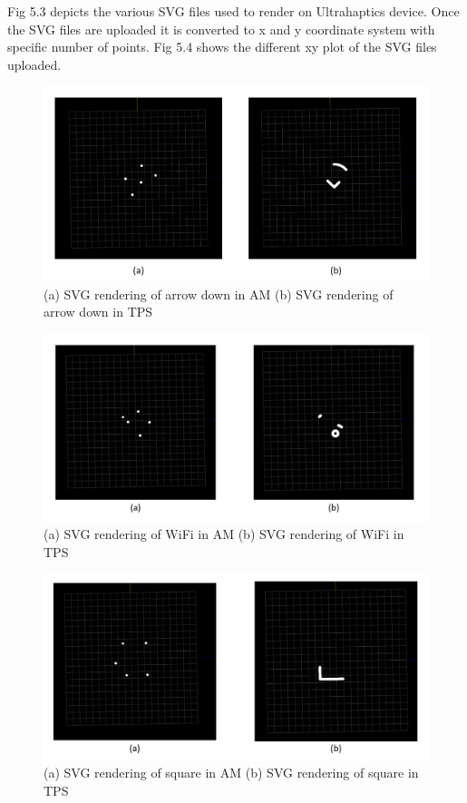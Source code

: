 Fig 5.3 depicts the various SVG files used to render on Ultrahaptics device. Once the SVG files are uploaded  it is converted to x and y coordinate system with specific number of points. Fig 5.4 shows the different xy plot of the SVG files uploaded.
 

\begin{figure}[H]
	\includegraphics[width=\textwidth]{gfx/svg_ad.png}
	\caption{(a) SVG rendering of arrow down in AM (b) SVG rendering of arrow down in TPS}
	\label{fig:validation:svg_ad}
\end{figure}

\begin{figure}[H]
	\includegraphics[width=\textwidth]{gfx/svg_wifi.png}
	\caption{(a) SVG rendering of WiFi in AM (b) SVG rendering of WiFi in TPS}
	\label{fig:validation:svg_wifi}
\end{figure}

\begin{figure}[H]
	\includegraphics[width=\textwidth]{gfx/svg_sq.png}
	\caption{(a) SVG rendering of square in AM (b) SVG rendering of square in TPS}
	\label{fig:validation:svg_sq}
\end{figure}

